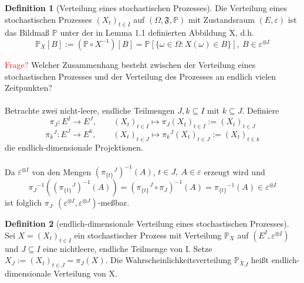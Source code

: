 \documentclass[a4paper,12pt]{scrartcl}
\theoremstyle{definition}
\newtheorem{defi}{Definition}[section]
\begin{document}
\begin{defi}[Verteilung eines stochastischen Prozesses]
Die Verteilung eines stochastischen Prozesses $(X_{t})_{t\in I}$ auf $(\Omega, \mathfrak{F}, \mathbb{P})$ mit Zustandsraum $(E, \varepsilon)$ ist das Bildmaß $\mathbb{P}$ unter der in Lemma 1.1 definierten Abbildung X, d.h.
\begin{equation*} 
{{\mathbb{P}}_{X}}[B] := (\mathbb{P} \circ X^{-1})[B] = \mathbb{P}[ \lbrace \omega \in \Omega : X(\omega) \in B\rbrace] , \: B \in \varepsilon^{ \otimes I}
\end{equation*}
\end{defi}
\noindent
\textcolor{red}{Frage?} Welcher Zusammenhang besteht zwischen der Verteilung eines stochastischen Prozesses und der Verteilung des Prozesses an endlich vielen Zeitpunkten?
\\
\\
Betrachte zwei nicht-leere, endliche Teilmengen $J,k \subseteq I$ mit $k \subseteq J$. Definiere
\begin{equation*}
\pi_{J}: E^{I} \to E^{J}, \qquad  {(X_{t})}_{t\in I} \mapsto \pi_{J}{(X_{t})}_{t\in I}:= {(X_{t})}_{t\in J}
\end{equation*}
\begin{equation*}
{\pi_{k}}^{J}: E^{J} \to E^{k}, \qquad  {(X_{t})}_{t\in J} \mapsto {\pi_{k}}^{J}{(X_{t})}_{t\in J}:= {(X_{t})}_{t\in k}
\end{equation*}
die endlich-dimensionale Projektionen.
\\
\\
Da $\varepsilon^{ \otimes I}$ von den Mengen ${({\pi_{\lbrace t \rbrace}}^{J})}^{-1}(A)$, $t \in J, \: A \in \varepsilon$ erzeugt wird und
\begin{equation*}
{\pi_{J}}^{-1}({({\pi_{\lbrace t \rbrace}}^{J})}^{-1}(A)) = {({\pi_{\lbrace t \rbrace}}^{J} \circ \pi_{J})}^{-1}(A) = {\pi_{\lbrace t \rbrace}}^{-1}(A) \in \varepsilon^{ \otimes I} 
\end{equation*}
ist folglich $\pi_{J} \: \:  (\varepsilon^{ \otimes I}, \varepsilon^{ \otimes J})$-meßbar.
\begin{defi}[endlich-dimensionale Verteilung eines stochastischen Prozesses]
Sei $X = {(X_{t})}_{t\in I}$ ein stochastischer Prozess mit Verteilung ${\mathbb{P}}_X$ auf $(E^{I},\varepsilon^{ \otimes I})$ und $J \subseteq I$ eine nichtleere, endliche Teilmenge von I. Setze $X_{J} := {(X_{t})}_{t\in J} = \pi_{J}(X)$. Die Wahrscheinlichkeitsverteilung ${{\mathbb{P}}_X}_{J}$ heißt endlich-dimensionale Verteilung von X.
\end{defi}
\end{document}
